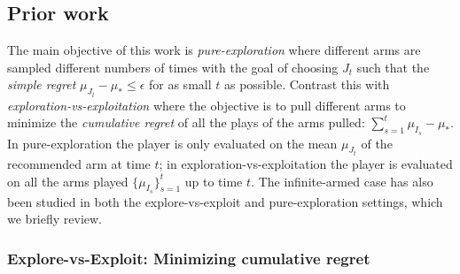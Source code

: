 


\subsection{Prior work}\label{prior_work}

The main objective of this work is \emph{pure-exploration} where different arms are sampled different numbers of times with the goal of choosing $J_t$ such that the \emph{simple regret} $\mu_{J_t}-\mu_* \leq \epsilon$ for as small $t$ as possible. 
Contrast this with \emph{exploration-vs-exploitation} where the objective is to pull different arms to minimize the \emph{cumulative regret} of all the plays of the arms pulled: $\sum_{s=1}^t \mu_{I_s} - \mu_*$.
In pure-exploration the player is only evaluated on the mean $\mu_{J_t}$ of the recommended arm at time $t$; in exploration-vs-exploitation the player is evaluated on all the arms played $\{ \mu_{I_s} \}_{s=1}^t$ up to time $t$. 
The infinite-armed case has also been studied in both the explore-vs-exploit and pure-exploration settings, which we briefly review. 


\subsubsection{Explore-vs-Exploit: Minimizing cumulative regret} 

